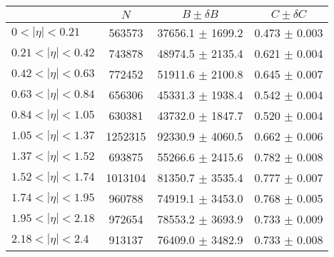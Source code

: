 \begin{tabular}{lccc}
\hline
    &   $N$   & $B \pm \delta B$  &  $C \pm \delta C$ \\
\hline
$0 < |\eta| <0.21$             & 563573     & 37656.1    $\pm$ 1699.2 & 0.473      $\pm$ 0.003 \\
$0.21 < |\eta| <0.42$          & 743878     & 48974.5    $\pm$ 2135.4 & 0.621      $\pm$ 0.004 \\
$0.42 < |\eta| <0.63$          & 772452     & 51911.6    $\pm$ 2100.8 & 0.645      $\pm$ 0.007 \\
$0.63 < |\eta| <0.84$          & 656306     & 45331.3    $\pm$ 1938.4 & 0.542      $\pm$ 0.004 \\
$0.84 < |\eta| <1.05$          & 630381     & 43732.0    $\pm$ 1847.7 & 0.520      $\pm$ 0.004 \\
$1.05 < |\eta| <1.37$          & 1252315    & 92330.9    $\pm$ 4060.5 & 0.662      $\pm$ 0.006 \\
$1.37 < |\eta| <1.52$          & 693875     & 55266.6    $\pm$ 2415.6 & 0.782      $\pm$ 0.008 \\
$1.52 < |\eta| <1.74$          & 1013104    & 81350.7    $\pm$ 3535.4 & 0.777      $\pm$ 0.007 \\
$1.74 < |\eta| <1.95$          & 960788     & 74919.1    $\pm$ 3453.0 & 0.768      $\pm$ 0.005 \\
$1.95 < |\eta| <2.18$          & 972654     & 78553.2    $\pm$ 3693.9 & 0.733      $\pm$ 0.009 \\
$2.18 < |\eta| <2.4$           & 913137     & 76409.0    $\pm$ 3482.9 & 0.733      $\pm$ 0.008 \\
\hline
\end{tabular}
